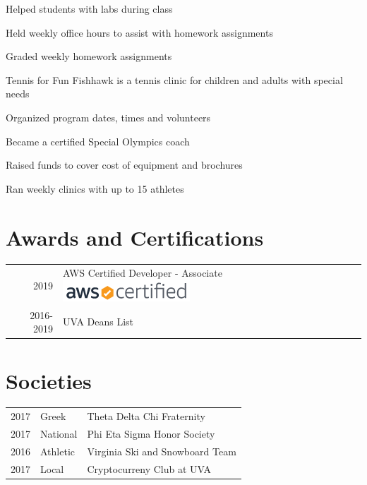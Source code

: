 \documentclass[]{deedy-resume-openfont}
\begin{document}
\begin{minipage}[t]{0.66\textwidth}
\begin{tightemize}
\item Helped students with labs during class \item Held weekly office hours to assist with homework assignments \item Graded weekly homework assignments
\end{tightemize}
\sectionsep

\begin{tightemize}
\item 	Tennis for Fun Fishhawk is a tennis clinic for children and adults with special needs\item 	Organized program dates, times and volunteers \item Became a certified Special Olympics coach \item	Raised funds to cover cost of equipment and brochures \item  Ran weekly clinics with up to 15 athletes  \end{tightemize}
\sectionsep



\section{Awards and Certifications} 
\begin{tabular}{rll}
2019 &  AWS Certified Developer - Associate       \includegraphics[scale=.35]{aws-certified-logo_color-horz_180x30.png}\\
2016-2019 & UVA Deans List \\

\end{tabular}
\sectionsep


\section{Societies} 

\begin{tabular}{rll}
2017 	& Greek    & Theta Delta Chi Fraternity\\
2017   & National   & Phi Eta Sigma Honor Society\\
2016  & Athletic    & Virginia Ski and Snowboard Team \\
2017   & Local  &    Cryptocurreny Club at UVA
\end{tabular}
\sectionsep

\end{minipage} 
\end{document}
